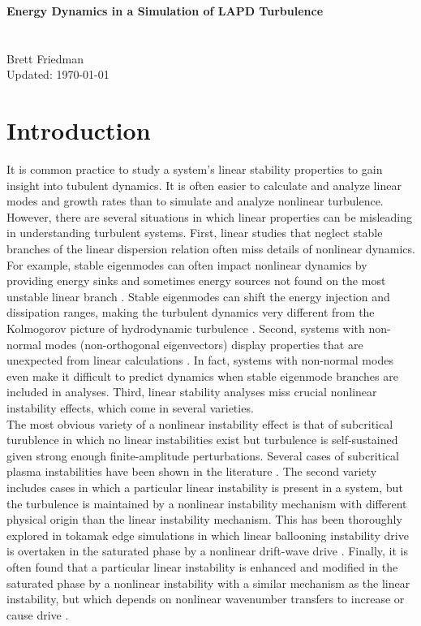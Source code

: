 \documentclass[12pt]{article}
\begin{document}
{\bf \large Energy Dynamics in a Simulation of LAPD Turbulence \\
 \\
 \\} 
Brett Friedman \\
Updated: \today \\

\hrulefill

\section{Introduction}
It is common practice to study a system's linear stability properties to gain insight into tubulent dynamics. It is often easier to calculate and analyze linear modes and growth rates than
to simulate and analyze nonlinear turbulence. However, there are several situations in which linear properties can be misleading in understanding turbulent systems. First,
linear studies that neglect stable branches of the linear dispersion relation often miss details of nonlinear dynamics. For example, stable eigenmodes can often
impact nonlinear dynamics by providing energy sinks and sometimes energy sources not found on the most unstable linear branch
\cite{baver2002,terry2002,terry2006a,terry2006b,gatto2006,terry2009,hatch2009,kim2010,makwana2011,hatch2011}. Stable eigenmodes can shift
the energy injection and dissipation ranges, making the turbulent dynamics very different from the Kolmogorov picture of hydrodynamic turbulence \cite{Kolmogorov1941}.
Second, systems with non-normal modes (non-orthogonal eigenvectors) display properties that are unexpected from linear calculations \cite{kim2010,camargo1998}. 
In fact, systems with non-normal modes even make it difficult to predict dynamics
when stable eigenmode branches are included in analyses. Third, linear stability analyses miss crucial nonlinear instability effects, which come in several varieties. \\

The most obvious variety of a nonlinear instability effect is that of subcritical turublence in which no linear instabilities exist but turbulence is self-sustained 
given strong enough finite-amplitude perturbations. Several cases of subcritical plasma instabilities have been shown in the literature \cite{scott1990,scott1992,drake1995,nordman1993,waltz1985}.
The second variety includes cases in which a particular linear instability is present in a system, but the turbulence is maintained
by a nonlinear instability mechanism with different physical origin than the linear instability mechanism. This has been thoroughly explored in tokamak edge simulations in which
linear ballooning instability drive is overtaken in the saturated phase by a nonlinear drift-wave drive \cite{zeiler1996,zeiler1997,scott2002,scott2003,scott2005}.
Finally, it is often found that a particular linear instability is enhanced and modified in the saturated phase by a nonlinear instability with a similar mechanism as the linear instability,
but which depends on nonlinear wavenumber transfers to increase or cause drive \cite{biskamp1995,korsholm1999}. \\
\end{document}
